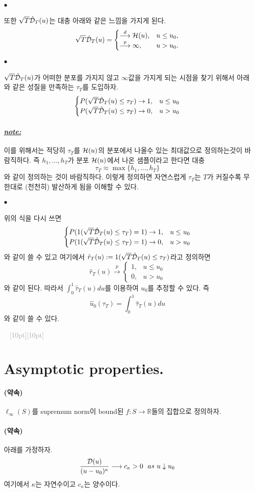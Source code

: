 \documentclass[12pt,oneside,english]{book}
\newcommand{\dash}{\vspace{2em}\noindent \textcolor{darkgray}{\hrulefill~ \raisebox{-2.5pt}[10pt][10pt]{\leafright \decofourleft \decothreeleft  \aldineright \decotwo \floweroneleft \decoone   \floweroneright \decotwo \aldineleft\decothreeright \decofourright \leafleft} ~  \hrulefill \\ \vspace{2em}}}
\def\ck{\paragraph{\LARGE$\bullet$}\LARGE}
\def\promise{\paragraph{\LARGE(약속)}\LARGE}
\def\note{\paragraph{\LARGE\textit{\underline{note:}}}\LARGE}
\begin{document}
\ck 또한 $\sqrt{T}\hat{\cal D}_T(u)$는 대충 아래와 같은 느낌을 가지게 된다. 
$$\sqrt{T}\hat{\cal D}_T(u)=\begin{cases}
\overset{d}{\longrightarrow} {\cal H}(u) ,& u\leq u_0, \\ 
\overset{p}{\longrightarrow} \infty, & u>u_0.
\end{cases}$$

\ck $\sqrt{T}\hat{\cal D}_T(u)$가 어떠한 분포를 가지지 않고 $\infty$값을 가지게 되는 시점을 찾기 위해서 아래와 같은 성질을 만족하는 $\tau_T$를 도입하자. 
$$\begin{cases}
P(\sqrt{T}\hat{\cal D}_T(u)\leq \tau_T) \rightarrow 1, &u\leq u_0 \\ 
P(\sqrt{T}\hat{\cal D}_T(u)\leq \tau_T) \rightarrow 0, &u > u_0
\end{cases}$$

\note 이를 위해서는 적당히 $\tau_T$를 ${\cal H}(u)$의 분포에서 나올수 있는 최대값으로 정의하는것이 바람직하다. 즉 $h_1,\dots,h_T$가 분포 ${\cal H}(u)$에서 나온 샘플이라고 한다면 대충 
$$\tau_T \approx \max\{h_1,\dots,h_T\}$$
와 같이 정의하는 것이 바람직하다. 이렇게 정의하면 자연스럽게 $\tau_T$는 $T$가 커질수록 무한대로 (천천히) 발산하게 됨을 이해할 수 있다.

\ck 위의 식을 다시 쓰면 
$$\begin{cases}
P(1(\sqrt{T}\hat{\cal D}_T(u)\leq \tau_T)=1) \rightarrow 1, &u\leq u_0 \\ 
P(1(\sqrt{T}\hat{\cal D}_T(u)\leq \tau_T)=1) \rightarrow 0, &u > u_0
\end{cases}$$
와 같이 쓸 수 있고 여기에서 $\hat{r}_T(u):=1(\sqrt{T}\hat{\cal D}_T(u)\leq \tau_T)$라고 정의하면 
$$\hat{r}_T(u) \overset{p}{\longrightarrow} \begin{cases}
1, & u\leq u_0 \\
0, & u>u_0
\end{cases}$$
와 같이 된다. 따라서 $\int_0^1\hat{\tau}_T(u)du$를 이용하여 $u_0$를 추정할 수 있다. 즉
$$\hat{u}_0(\tau_T)=\int_0^1\hat{\tau}_T(u)du$$
와 같이 쓸 수 있다. 

\dash 

\section{Asymptotic properties.}
\promise
$\ell_{\infty}(S)$를 supremum norm이 bound된 $f:S\rightarrow \mathbb{R}$들의 집합으로 정의하자. 

\promise 아래를 가정하자. 
$$\frac{{\cal D}(u)}{(u-u_0)^{\kappa}} \longrightarrow c_{\kappa} >0~~as~ u\downarrow u_0$$
여기에서 $\kappa$는 자연수이고 $c_{\kappa}$는 양수이다.
\end{document}
